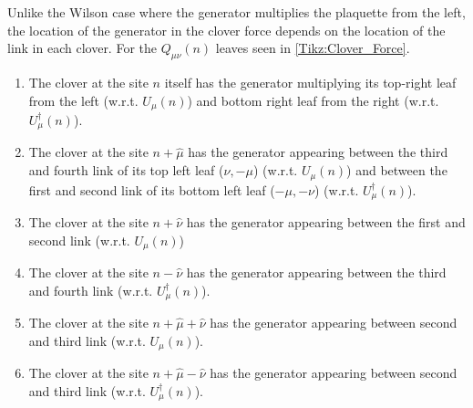 	Unlike the Wilson case where the generator multiplies the plaquette from the left, the location of the generator in
	the clover force depends on the location of the link in each clover. For the $Q_{\mu\nu}(n)$ leaves seen in 
	\cref{Tikz:Clover_Force}.
	\begin{enumerate}
		\item The clover at the site $n$ itself has the generator multiplying its top-right leaf from the left (w.r.t. $U_\mu(n)$)
				and bottom right leaf from the right (w.r.t. $U^\dagger_\mu(n)$).
		\item The clover at the site $n+\hat{\mu}$ has the generator appearing between the third and fourth link of its
				top left leaf ($\nu,-\mu$) (w.r.t. $U_\mu(n)$) and between the first and second link of its bottom left leaf
				($-\mu,-\nu$) (w.r.t. $U^\dagger_\mu(n)$).
		\item The clover at the site $n+\hat{\nu}$ has the generator appearing between the first and second link (w.r.t. $U_\mu(n)$)
		\item The clover at the site $n-\hat{\nu}$ has the generator appearing between the third and fourth link
				(w.r.t. $U^\dagger_\mu(n)$).
		\item The clover at the site $n+\hat{\mu}+\hat{\nu}$ has the generator appearing between second and third link (w.r.t. $U_\mu(n)$).
		\item The clover at the site $n+\hat{\mu}-\hat{\nu}$ has the generator appearing between second and third link
				(w.r.t. $U^\dagger_\mu(n)$).
	\end{enumerate}

